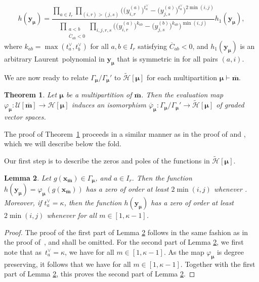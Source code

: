 \documentclass[pdftex]{sigma}
\numberwithin{equation}{section}
\newtheorem{Theorem}{Theorem}[section]
\newtheorem{Lemma}[Theorem]{Lemma}
\begin{document}
\begin{equation}\label{eq:3.24}
h(\mathbf{y}_{\bm{\mu}})
=\frac{\prod_{a\in I_r}\prod_{(i,r)>(j,s)}\bigl(\bigl(y_{i,r}^{(a)}\bigr)^{t_a^{\vee}}-\bigl(y_{j,s}^{(a)}\bigr) ^{t_a^{\vee}})^{2\min(i,j)}}{\prod_{\substack{a<b \\\overline{C}_{ab}<0}} \prod_{i,j,r,s}\bigl(\bigl(y_{i,r}^{(a)}\bigr) ^{k_{ab}}-\bigl(y_{j,s}^{(b)}\bigr)^{k_{ab}}\bigr)^{\min(i,j)}} h_1(\mathbf{y}_{\bm{\mu}}),
\end{equation}
where $k_{ab}=\max(t_a^{\vee},t_b^{\vee})$ for all $a,b\in I_r$ satisfying $\overline{C}_{ab}<0$, and $h_1(\mathbf{y}_{\bm{\mu}})$ is an arbitrary Laurent~polynomial in $\mathbf{y}_{\bm{\mu}}$ that is symmetric in  for all pairs $(a,i)$.

We are now ready to relate $\Gamma_{\bm{\mu}}/ \Gamma_{\bm{\mu}}'$ to $\tilde{\mathcal{H}}[\bm{\mu}]$ for each multipartition $\bm{\mu}\vdash\overline{\mathbf{m}}$.

\begin{Theorem}\label{3.4}
Let $\bm{\mu}$ be a multipartition of $\overline{\mathbf{m}}$. Then the evaluation map $\varphi_{\bm{\mu}}\colon\mathcal{U}[\overline{\mathbf{m}}]\to \mathcal{H}[\bm{\mu}]$ induces an isomorphism $\overline{\varphi}_{\bm{\mu}}\colon\Gamma_{\bm{\mu}}/ \Gamma_{\bm{\mu}}'\to\tilde{\mathcal{H}}[\bm{\mu}]$ of graded vector spaces.
\end{Theorem}

The proof of Theorem~\ref{3.4} proceeds in a similar manner as in the proof of \cite[Theorem 3.6]{AKS06} and \cite[Theorem 4.1]{AK07}, which we will describe below the fold.

Our first step is to describe the zeros and poles of the functions in $\tilde{\mathcal{H}}[\bm{\mu}]$.

\begin{Lemma}\label{3.5}
Let $g(\mathbf{x}_{\overline{\mathbf{m}}})\in \Gamma_{\bm{\mu}}$, and $a\in I_r$. Then the function $h(\mathbf{y}_{\bm{\mu}})=\varphi_{\bm{\mu}}(g(\mathbf{x}_{\overline{\mathbf{m}}}))$ has a zero of order at least $2\min(i,j)$ whenever . Moreover, if $t_a^{\vee}=\kappa$, then the function $h(\mathbf{y}_{\bm{\mu}})$ has a zero of order at least $2\min(i,j)$ whenever  for all $m\in[1,\kappa-1]$.
\end{Lemma}

\begin{proof}
The proof of the first part of Lemma \ref{3.5} follows in the same fashion as in the proof of~\cite[Lemma 3.7]{AKS06}, and shall be omitted. For the second part of Lemma \ref{3.5}, we first note that as~${t_a^{\vee}=\kappa}$, we have  for all $m\in [1,\kappa-1]$. As the map $\varphi_{\bm{\mu}}$ is degree preserving, it follows that we have  for all $m\in [1,\kappa-1]$. Together with the first part of Lemma \ref{3.5}, this proves the second part of Lemma \ref{3.5}.
\end{proof}
\end{document}
